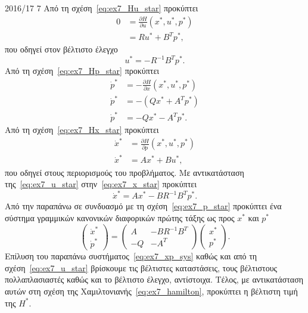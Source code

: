 \begin{solution}{2016/17 7}
    Από τη σχέση~\eqref{eq:ex7_Hu_star} προκύπτει
    \begin{align*}
        0 &= \frac{\partial H}{\partial u} (x^*, u^*, p^*) \\
        &= Ru^* + B^{T}p^*,
    \end{align*}
    που οδηγεί στον βέλτιστο έλεγχο
    \begin{equation}\label{eq:ex7_u_star}
        u^* = -R^{-1}B^{T}p^*.
    \end{equation}
    Από τη σχέση~\eqref{eq:ex7_Hp_star} προκύπτει
    \begin{align}\label{eq:ex7_p_star}
        \dot{p}^* &= -\frac{\partial H}{\partial x} (x^*, u^*, p^*) \nonumber \\
        \dot{p}^* &= -\left(Qx^* + A^{T}p^*\right) \nonumber \\
        \dot{p}^* &= -Qx^* - A^{T}p^*.
    \end{align}
    Από τη σχέση~\eqref{eq:ex7_Hx_star} προκύπτει
    \begin{align}\label{eq:ex7_x_star}
        \dot{x}^* &= \frac{\partial H}{\partial p} (x^*, u^*, p^*) \nonumber \\
        \dot{x}^* &= Ax^* + Bu^*,
    \end{align}
    που οδηγεί στους περιορισμούς του προβλήματος. Με αντικατάσταση
    της~\eqref{eq:ex7_u_star} στην~\eqref{eq:ex7_x_star} προκύπτει
    \[
        \dot{x}^* = Ax^* - BR^{-1}B^{T}p^*.
    \]
    Από την παραπάνω σε συνδυασμό με τη σχέση~\eqref{eq:ex7_p_star} προκύπτει
    ένα σύστημα γραμμικών κανονικών διαφορικών πρώτης τάξης ως προς
    \( x^* \) και \( p^* \)
    \begin{equation}\label{eq:ex7_xp_sys}
        \begin{pmatrix}
            \dot{x}^* \\
            \dot{p}^*
        \end{pmatrix} =
        \begin{pmatrix}
            A & -BR^{-1}B^{T} \\
            -Q & -A^{T}
        \end{pmatrix}
        \begin{pmatrix}
            x^* \\
            p^*
        \end{pmatrix}.
    \end{equation}
    Επίλυση του παραπάνω συστήματος~\eqref{eq:ex7_xp_sys} καθώς και από τη
    σχέση~\eqref{eq:ex7_u_star} βρίσκουμε τις βέλτιστες καταστάσεις, τους
    βέλτιστους πολλαπλασιαστές  καθώς και το βέλτιστο έλεγχο,
    αντίστοιχα. Τέλος, με αντικατάσταση αυτών στη σχέση της
    Χαμιλτονιανής~\eqref{eq:ex7_hamilton}, προκύπτει η βέλτιστη τιμή της \( H^*
    \).


\end{solution}

